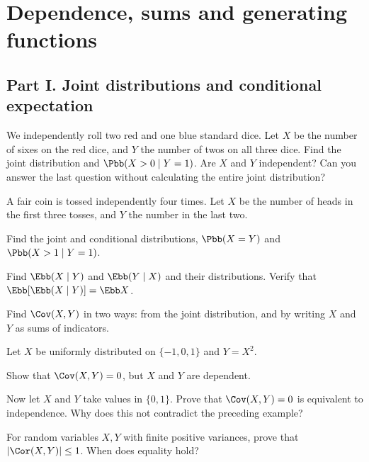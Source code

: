 \section{Dependence, sums and generating functions}
\subsection*{Part I. Joint distributions and conditional expectation}
\begin{problembook}
We independently roll two red and one blue standard dice. Let $X$ be the number
of sixes on the red dice, and $Y$ the number of twos on all three dice. Find the
joint distribution and $\Pbb(X>0\mid Y=1)$. Are $X$ and $Y$ independent?
Can you answer the last question without calculating the entire joint distribution?
\end{problembook}
\begin{problembook}
A fair coin is tossed independently four times. Let $X$ be the number of heads
in the first three tosses, and $Y$ the number in the last two.
\begin{enumeratea}
  \item Find the joint and conditional distributions, $\Pbb(X=Y)$ and $\Pbb(X>1\mid Y=1)$.
  \item Find $\Ebb(X\mid Y)$ and $\Ebb(Y\mid X)$ and their distributions.
  Verify that $\Ebb[\Ebb(X\mid Y)]=\Ebb X$.
  \item Find $\Cov(X,Y)$ in two ways: from the joint distribution, and by writing
  $X$ and $Y$ as sums of indicators.
\end{enumeratea}
\end{problembook}
\begin{problembook}
Let $X$ be uniformly distributed on $\{-1,0,1\}$ and $Y=X^2$.
\begin{enumeratea}
  \item Show that $\Cov(X,Y)=0$, but $X$ and $Y$ are dependent.
  \item Now let $X$ and $Y$ take values in $\{0,1\}$. Prove that $\Cov(X,Y)=0$
  is equivalent to independence. Why does this not contradict the preceding example?
  \item For random variables $X,Y$ with finite positive variances, prove that
  $|\Cor(X,Y)|\le1$. When does equality hold?
\end{enumeratea}
\end{problembook}
